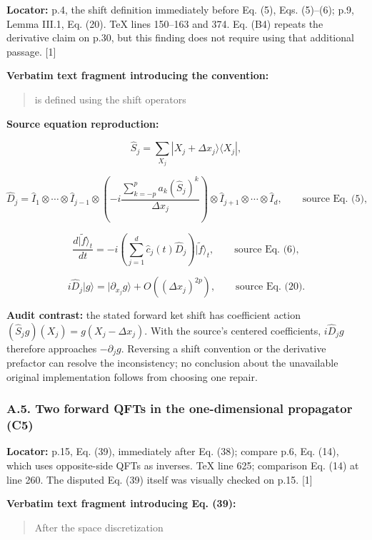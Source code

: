 \textbf{Locator:} p.4, the shift definition immediately before Eq. (5),
Eqs. (5)--(6); p.9, Lemma III.1, Eq. (20). TeX lines 150--163 and 374.
Eq. (B4) repeats the derivative claim on p.30, but this finding does not
require using that additional passage. {[}1{]}

\textbf{Verbatim text fragment introducing the convention:}

\begin{quote}
is defined using the shift operators
\end{quote}

\textbf{Source equation reproduction:}

\[
\hat S_j=\sum_{X_j}|X_j+\Delta x_j\rangle\langle X_j|,
\]

\[
\hat D_j=\hat I_1\otimes\cdots\otimes\hat I_{j-1}
\otimes\left(-i\frac{\sum_{k=-p}^{p}a_k(\hat S_j)^k}{\Delta x_j}\right)
\otimes\hat I_{j+1}\otimes\cdots\otimes\hat I_d,
\qquad\text{source Eq. (5)},
\]

\[
\frac{d|\widetilde f\rangle_t}{dt}
=-i\left(\sum_{j=1}^{d}\hat c_j(t)\hat D_j\right)|\widetilde f\rangle_t,
\qquad\text{source Eq. (6)},
\]

\[
i\hat D_j|g\rangle=|\partial_{x_j}g\rangle+O((\Delta x_j)^{2p}),
\qquad\text{source Eq. (20)}.
\]

\textbf{Audit contrast:} the stated forward ket shift has coefficient
action \((\hat S_jg)(X_j)=g(X_j-\Delta x_j)\). With the source's
centered coefficients, \(i\hat D_jg\) therefore approaches
\(-\partial_jg\). Reversing a shift convention or the derivative
prefactor can resolve the inconsistency; no conclusion about the
unavailable original implementation follows from choosing one repair.

\subsubsection{A.5. Two forward QFTs in the one-dimensional propagator
(C5)}\label{a.5.-two-forward-qfts-in-the-one-dimensional-propagator-c5}

\textbf{Locator:} p.15, Eq. (39), immediately after Eq. (38); compare
p.6, Eq. (14), which uses opposite-side QFTs as inverses. TeX line 625;
comparison Eq. (14) at line 260. The disputed Eq. (39) itself was
visually checked on p.15. {[}1{]}

\textbf{Verbatim text fragment introducing Eq. (39):}

\begin{quote}
After the space discretization
\end{quote}

